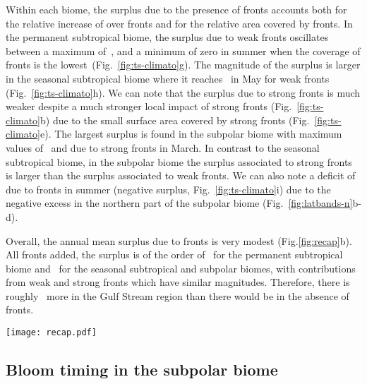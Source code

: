 Within each biome, the surplus  due to the presence of fronts accounts both for the relative increase of  over fronts and for the relative area covered by fronts.
In the permanent subtropical biome, the surplus due to weak fronts oscillates between a maximum of~, and a minimum of zero in summer when the coverage of fronts is the lowest~(Fig.~\ref{fig:ts-climato}g).
The magnitude of the surplus is larger in the seasonal subtropical biome where it reaches~ in May for weak fronts (Fig.~\ref{fig:ts-climato}h).
We can note that the surplus due to strong fronts is much weaker despite a much stronger local impact of strong fronts (Fig.~\ref{fig:ts-climato}b) due to the small surface area covered by strong fronts (Fig.~\ref{fig:ts-climato}e).
The largest surplus is found in the subpolar biome with maximum values of~ and due to strong fronts in March.
In contrast to the seasonal subtropical biome, in the subpolar biome the surplus associated to strong fronts is larger than the surplus associated to weak fronts.
We can also note a deficit of  due to fronts in summer (negative surplus, Fig.~\ref{fig:ts-climato}i) due to the negative excess in the northern part of the subpolar biome (Fig.~\ref{fig:latbands-n}b-d).

Overall, the annual mean  surplus due to fronts is very modest (Fig.\ref{fig:recap}b).
All fronts added, the surplus is of the order of~ for the permanent subtropical biome and~ for the seasonal subtropical and subpolar biomes, with contributions from weak and strong fronts which have similar magnitudes.
Therefore, there is roughly~ more  in the Gulf Stream region than there would be in the absence of fronts.

\begin{figure*}
  \texttt{[image: recap.pdf]}
  \caption{
    (a)~Annual mean local   excess over fronts (in \%), sorted by latitudinal band (x-axis),  by biome (shape of symbol) and by front type (weak fronts in blue, strong fronts in green).
    (b)~Annual mean global surplus of  (in \%) for each biome, sorted by front type.
  }%
  \label{fig:recap}
\end{figure*}


\subsection{Bloom timing in the subpolar biome}

